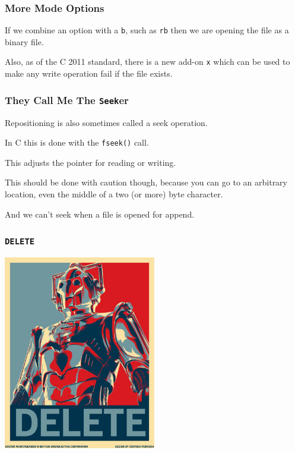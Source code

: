 \begin{frame}
	\frametitle{More Mode Options}

	If we combine an option with a \texttt{b}, such as \texttt{rb} then we are opening the file as a binary file.

	Also, as of the C 2011 standard, there is a new add-on \texttt{x} which can be used to make any write operation fail if the file exists.

\end{frame}

\begin{frame}
	\frametitle{They Call Me The \texttt{Seek}er}

	Repositioning is also sometimes called a seek operation.

	In C this is done with the \texttt{fseek()} call.

	This adjusts the pointer for reading or writing.

	This should be done with caution though, because you can go to an arbitrary location, even the middle of a two (or more) byte character.

	And we can't seek when a file is opened for append.

\end{frame}


\begin{frame}
	\frametitle{\texttt{DELETE}}

	\begin{center}
		\includegraphics[width=0.5\textwidth]{images/delete.png}
	\end{center}

\end{frame}



